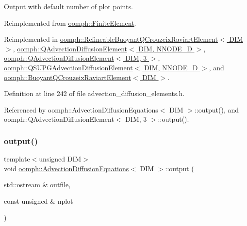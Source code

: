 Output with default number of plot points. 



Reimplemented from \hyperlink{classoomph_1_1FiniteElement_a2ad98a3d2ef4999f1bef62c0ff13f2a7}{oomph\+::\+Finite\+Element}.



Reimplemented in \hyperlink{classoomph_1_1RefineableBuoyantQCrouzeixRaviartElement_abbe05b977edbfec7752ed417b90e09fa}{oomph\+::\+Refineable\+Buoyant\+Q\+Crouzeix\+Raviart\+Element$<$ D\+I\+M $>$}, \hyperlink{classoomph_1_1QAdvectionDiffusionElement_af30152cc8ea671b103239fc6b3e506ce}{oomph\+::\+Q\+Advection\+Diffusion\+Element$<$ D\+I\+M, N\+N\+O\+D\+E\+\_\+D $>$}, \hyperlink{classoomph_1_1QAdvectionDiffusionElement_af30152cc8ea671b103239fc6b3e506ce}{oomph\+::\+Q\+Advection\+Diffusion\+Element$<$ D\+I\+M, 3 $>$}, \hyperlink{classoomph_1_1QSUPGAdvectionDiffusionElement_a13469ca1c2520461e62374e600ecf84d}{oomph\+::\+Q\+S\+U\+P\+G\+Advection\+Diffusion\+Element$<$ D\+I\+M, N\+N\+O\+D\+E\+\_\+D $>$}, and \hyperlink{classoomph_1_1BuoyantQCrouzeixRaviartElement_a3817706dbf3c755b4029917dac80bad7}{oomph\+::\+Buoyant\+Q\+Crouzeix\+Raviart\+Element$<$ D\+I\+M $>$}.



Definition at line 242 of file advection\+\_\+diffusion\+\_\+elements.\+h.



Referenced by oomph\+::\+Advection\+Diffusion\+Equations$<$ D\+I\+M $>$\+::output(), and oomph\+::\+Q\+Advection\+Diffusion\+Element$<$ D\+I\+M, 3 $>$\+::output().

\mbox{\label{classoomph_1_1AdvectionDiffusionEquations_ade5e445c7b99593a68fc8e42631d79be}} 
\subsubsection{\texorpdfstring{output()}{output()}\hspace{0.1cm}{\footnotesize\ttfamily [2/4]}}
{\footnotesize\ttfamily template$<$unsigned D\+IM$>$ \\
void \hyperlink{classoomph_1_1AdvectionDiffusionEquations}{oomph\+::\+Advection\+Diffusion\+Equations}$<$ D\+IM $>$\+::output (\begin{DoxyParamCaption}\item[{std\+::ostream \&}]{outfile,  }\item[{const unsigned \&}]{nplot }\end{DoxyParamCaption})\hspace{0.3cm}{\ttfamily [virtual]}}



